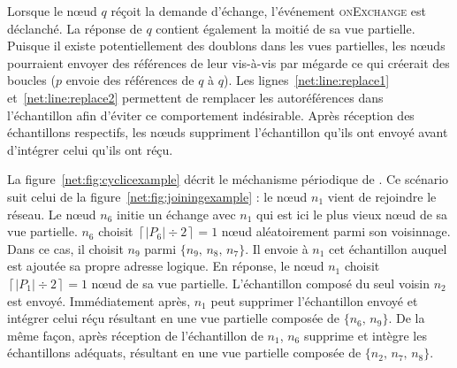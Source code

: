 Lorsque le nœud $q$ réçoit la demande d'échange, l'événement \textsc{onExchange}
est déclanché. La réponse de $q$ contient également la moitié de sa vue
partielle. Puisque il existe potentiellement des doublons dans les vues
partielles, les nœuds pourraient envoyer des références de leur vis-à-vis par
mégarde ce qui créerait des boucles ($p$ envoie des références de $q$ à
$q$). Les lignes~\ref{net:line:replace1} et~\ref{net:line:replace2} permettent de
remplacer les autoréférences dans l'échantillon afin d'éviter ce comportement
indésirable. Après réception des échantillons respectifs, les nœuds suppriment
l'échantillon qu'ils ont envoyé avant d'intégrer celui qu'ils ont réçu.

\begin{figure*}
  \centering
  \hspace{40pt}
  \hspace{10pt}
  \caption{\label{net:fig:cyclicexample}Exemple du processus de mélange dans \SPRAY.}
\end{figure*}

La figure~\ref{net:fig:cyclicexample} décrit le méchanisme périodique de
\SPRAY. Ce scénario suit celui de la figure~\ref{net:fig:joiningexample} : le
nœud $n_1$ vient de rejoindre le réseau. Le nœud $n_6$ initie un échange avec
$n_1$ qui est ici le plus vieux nœud de sa vue partielle. $n_6$ choisit
$\left\lceil{|P_6|\div 2}\right\rceil = 1$ nœud aléatoirement parmi son
voisinnage. Dans ce cas, il choisit $n_9$ parmi $\{n_9,\,n_8,\,n_7\}$. Il envoie
à $n_1$ cet échantillon auquel est ajoutée sa propre adresse logique. En
réponse, le nœud $n_1$ choisit $\left\lceil{|P_1|\div 2}\right\rceil = 1$ nœud
de sa vue partielle. L'échantillon composé du seul voisin $n_2$ est
envoyé. Immédiatement après, $n_1$ peut supprimer l'échantillon envoyé et
intégrer celui réçu résultant en une vue partielle composée de $\{n_6,\, n_9\}$.
De la même façon, après réception de l'échantillon de $n_1$, $n_6$ supprime et
intègre les échantillons adéquats, résultant en une vue partielle composée de
$\{n_2,\,n_7,\,n_8\}$.

